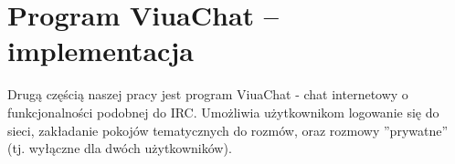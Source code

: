 \chapter{Program ViuaChat -- implementacja}
\label{program_viuachat_impl}

Drugą częścią naszej pracy jest program ViuaChat - chat internetowy o funkcjonalności podobnej do IRC.
Umożliwia użytkownikom logowanie się do sieci, zakładanie pokojów tematycznych do rozmów, oraz rozmowy
''prywatne'' (tj. wyłączne dla dwóch użytkowników).




